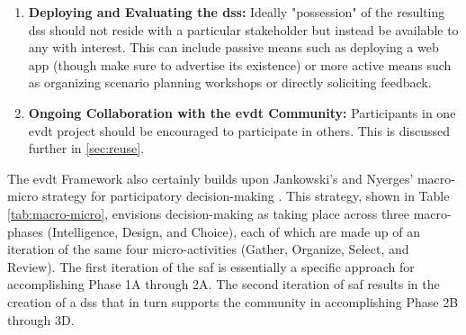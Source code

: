 \begin{enumerate}
	\item{\textbf{Deploying and Evaluating the \ac{dss}:} Ideally "possession" of the resulting \ac{dss} should not reside with a particular stakeholder but instead be available to any with interest. This can include passive means such as deploying a web app (though make sure to advertise its existence) or more active means such as organizing scenario planning workshops or directly soliciting feedback.}
	\item{\textbf{Ongoing Collaboration with the \ac{evdt} Community:} Participants in one \ac{evdt} project should be encouraged to participate in others. This is discussed further in \ref{sec:reuse}.}
\end{enumerate}

The \ac{evdt} Framework also certainly builds upon Jankowski's and Nyerges' macro-micro strategy for participatory decision-making \cite{jankowskiGISGroupDecision2001}. This strategy, shown in Table \ref{tab:macro-micro}, envisions decision-making as taking place across three macro-phases (Intelligence, Design, and Choice), each of which are made up of an iteration of the same four micro-activities (Gather, Organize, Select, and Review). The first iteration of the \ac{saf} is essentially a specific approach for accomplishing Phase 1A through 2A. The second iteration of \ac{saf} results in the creation of a \ac{dss} that in turn supports the community in accomplishing Phase 2B through 3D. 

